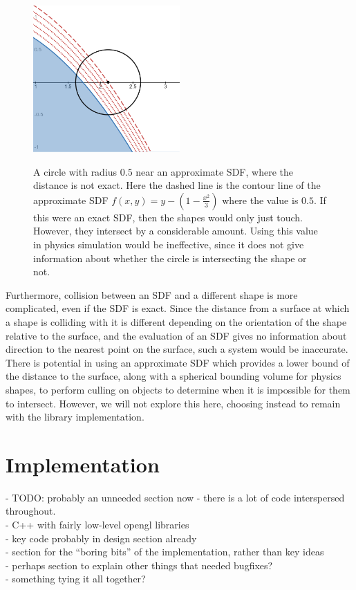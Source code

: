 \documentclass{article}
\begin{document}
\begin{figure}
  \caption{A circle with radius $0.5$ near an approximate SDF, where the distance is not exact. Here the dashed line is the contour line of the approximate SDF $f\left(x,y\right) = y - \left(1 - \frac{x^2}{3}\right)$ where the value is $0.5$. If this were an exact SDF, then the shapes would only just touch. However, they intersect by a considerable amount. Using this value in physics simulation would be ineffective, since it does not give information about whether the circle is intersecting the shape or not.}
  \includegraphics[width=0.5\textwidth]{approx_collision}
  \label{fig:approx_collision}
\end{figure}

Furthermore, collision between an SDF and a different shape is more complicated, even if the SDF is exact. Since the distance from a surface at which a shape is colliding with it is different depending on the orientation of the shape relative to the surface, and the evaluation of an SDF gives no information about direction to the nearest point on the surface, such a system would be inaccurate. There is potential in using an approximate SDF which provides a lower bound of the distance to the surface, along with a spherical bounding volume for physics shapes, to perform culling on objects to determine when it is impossible for them to intersect. However, we will not explore this here, choosing instead to remain with the library implementation.  


\section{Implementation}
- TODO: probably an unneeded section now - there is a lot of code interspersed throughout. \\
- C++ with fairly low-level opengl libraries\\
- key code probably in design section already\\
- section for the ``boring bits'' of the implementation, rather than key ideas\\
- perhaps section to explain other things that needed bugfixes?\\
- something tying it all together?
  
\end{document}
